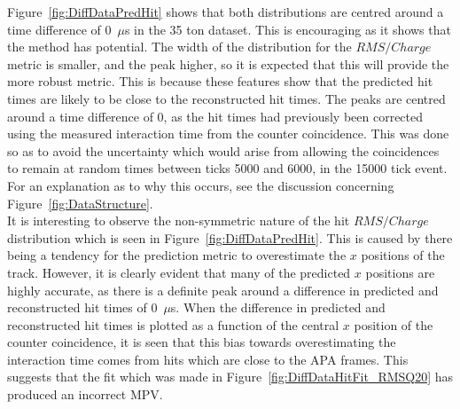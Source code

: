 Figure~\ref{fig:DiffDataPredHit} shows that both distributions are centred around a time difference of 0~$\mu$s in the 35 ton dataset. This is encouraging as it shows that the method has potential. The width of the distribution for the $RMS/Charge$ metric is smaller, and the peak higher, so it is expected that this will provide the more robust metric. This is because these features show that the predicted hit times are likely to be close to the reconstructed hit times. The peaks are centred around a time difference of 0, as the hit times had previously been corrected using the measured interaction time from the counter coincidence. This was done so as to avoid the uncertainty which would arise from allowing the coincidences to remain at random times between ticks 5000 and 6000, in the 15000 tick event. For an explanation as to why this occurs, see the discussion concerning Figure~\ref{fig:DataStructure}. \\

It is interesting to observe the non-symmetric nature of the hit $RMS/Charge$ distribution which is seen in Figure~\ref{fig:DiffDataPredHit}. This is caused by there being a tendency for the prediction metric to overestimate the $x$ positions of the track. However, it is clearly evident that many of the predicted $x$ positions are highly accurate, as there is a definite peak around a difference in predicted and reconstructed hit times of 0~$\mu$s. When the difference in predicted and reconstructed hit times is plotted as a function of the central $x$ position of the counter coincidence, it is seen that this bias towards overestimating the interaction time comes from hits which are close to the APA frames. This suggests that the fit which was made in Figure~\ref{fig:DiffDataHitFit_RMSQ20} has produced an incorrect MPV. \\

